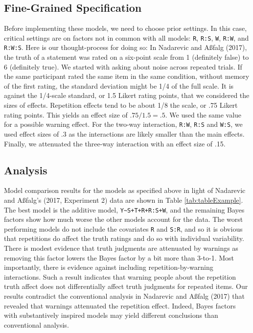 \documentclass[
  english,
  ,man]{apa6}
\begin{document}
\hypertarget{fine-grained-specification}{%
\subsection{Fine-Grained Specification}\label{fine-grained-specification}}

Before implementing these models, we need to choose prior settings. In this case, critical settings are on factors not in common with all models: \texttt{R}, \texttt{R:S}, \texttt{W}, \texttt{R:W}, and \texttt{R:W:S}. Here is our thought-process for doing so: In Nadarevic and Aßfalg (2017), the truth of a statement was rated on a six-point scale from 1 (definitely false) to 6 (definitely true). We started with asking about noise across repeated trials. If the same participant rated the same item in the same condition, without memory of the first rating, the standard deviation might be 1/4 of the full scale. It is against the 1/4-scale standard, or 1.5 Likert rating points, that we considered the sizes of effects. Repetition effects tend to be about 1/8 the scale, or .75 Likert rating points. This yields an effect size of \(.75/1.5 = .5\). We used the same value for a possible warning effect. For the two-way interaction, \texttt{R:W}, \texttt{R:S} and \texttt{W:S}, we used effect sizes of .3 as the interactions are likely smaller than the main effects. Finally, we attenuated the three-way interaction with an effect size of .15.

\hypertarget{analysis}{%
\subsection{Analysis}\label{analysis}}

Model comparison results for the models as specified above in light of Nadarevic and A\ss falg's (2017, Experiment 2) data are shown in Table \ref{tab:tableExample}. The best model is the additive model, \texttt{Y\textasciitilde{}S+T+R+R:S+W}, and the remaining Bayes factors show how much worse the other models account for the data. The worst performing models do not include the covariates \texttt{R} and \texttt{S:R}, and so it is obvious that repetitions do affect the truth ratings and do so with individual variability. There is modest evidence that truth judgments are attenuated by warnings as removing this factor lowers the Bayes factor by a bit more than 3-to-1. Most importantly, there is evidence against including repetition-by-warning interactions. Such a result indicates that warning people about the repetition truth affect does not differentially affect truth judgments for repeated items. Our results contradict the conventional analysis in Nadarevic and Aßfalg (2017) that revealed that warnings attenuated the repetition effect. Indeed, Bayes factors with substantively inspired models may yield different conclusions than conventional analysis.
\end{document}
